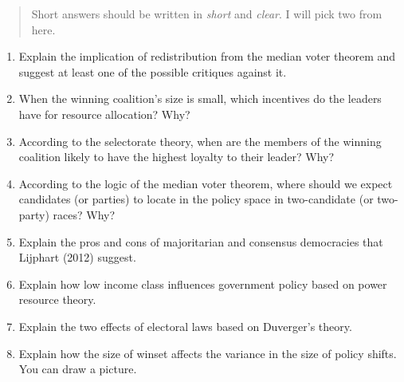 \documentclass[
]{book}
\begin{document}
\begin{quote}
Short answers should be written in \emph{short} and \emph{clear}. I will pick two from here.
\end{quote}

\begin{enumerate}
\def\labelenumi{\arabic{enumi}.}
\item
  Explain the implication of redistribution from the median voter theorem and suggest at least one of the possible critiques against it.
\item
  When the winning coalition's size is small, which incentives do the leaders have for resource allocation? Why?
\item
  According to the selectorate theory, when are the members of the winning coalition likely to have the highest loyalty to their leader? Why?
\item
  According to the logic of the median voter theorem, where should we expect candidates (or parties) to locate in the policy space in two-candidate (or two-party) races? Why?
\item
  Explain the pros and cons of majoritarian and consensus democracies that Lijphart (2012) suggest.
\item
  Explain how low income class influences government policy based on power resource theory.
\item
  Explain the two effects of electoral laws based on Duverger's theory.
\item
  Explain how the size of winset affects the variance in the size of policy shifts. You can draw a picture.
\end{enumerate}

  
\end{document}
